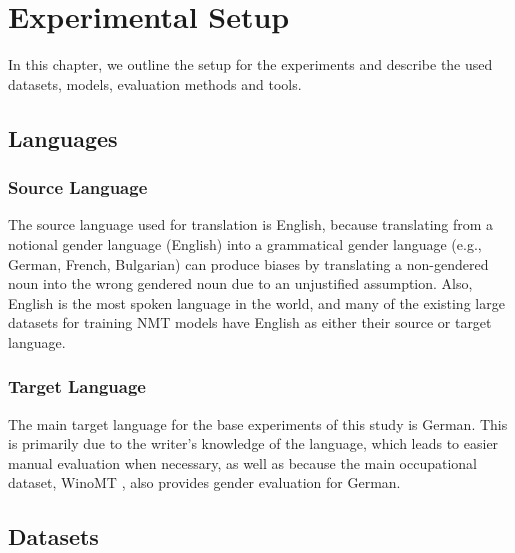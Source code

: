 \chapter{Experimental Setup}
\label{ch:Setup}

In this chapter, we outline the setup for the experiments and describe the used datasets, models, evaluation methods and tools.

\section{Languages}
\label{sec:Setup:Languages}


\subsection{Source Language} 
The source language used for translation is English, because translating from a notional gender language (English) into a grammatical gender language (e.g., German, French, Bulgarian) can produce biases by translating a non-gendered noun into the wrong gendered noun due to an unjustified assumption. Also, English is the most spoken language in the world, and many of the existing large datasets for training NMT models have English as either their source or target language.

\subsection{Target Language} 
The main target language for the base experiments of this study is German. This is primarily due to the writer's knowledge of the language, which leads to easier manual evaluation when necessary, as well as because the main occupational dataset, WinoMT \parencite{Stanovsky_2019}, also provides gender evaluation for German.


\section{Datasets}
\label{sec:Setup:Datasets}

